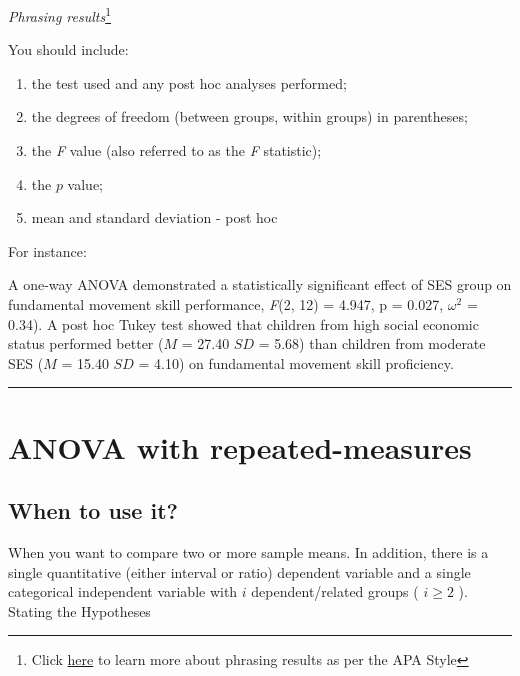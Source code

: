 \documentclass[
]{article}
\providecommand{\tightlist}{%
  \setlength{\itemsep}{0pt}\setlength{\parskip}{0pt}}
\begin{document}
\emph{Phrasing results}\footnote{Click \href{https://www.scribbr.com/apa-style/numbers-and-statistics/\#reporting-analysis-of-variance-anovas}{here} to learn more about phrasing results as per the APA Style}

You should include:

\begin{enumerate}
\def\labelenumi{\arabic{enumi}.}
\tightlist
\item
  the test used and any post hoc analyses performed;
\item
  the degrees of freedom (between groups, within groups) in parentheses;
\item
  the \emph{F} value (also referred to as the \emph{F} statistic);
\item
  the \(p\) value;
\item
  mean and standard deviation - post hoc
\end{enumerate}

For instance:

A one-way ANOVA demonstrated a statistically significant effect of SES group on fundamental movement skill performance, \emph{F}(2, 12) = 4.947, p = 0.027, \(\omega^2\) = 0.34). A post hoc Tukey test showed that children from high social economic status performed better (\(M\) = 27.40 \(SD\) = 5.68) than children from moderate SES (\(M\) = 15.40 \(SD\) = 4.10) on fundamental movement skill proficiency.

\begin{center}\rule{0.5\linewidth}{0.5pt}\end{center}

\hypertarget{anova-with-repeated-measures}{%
\section{ANOVA with repeated-measures}\label{anova-with-repeated-measures}}

\hypertarget{when-to-use-it-1}{%
\subsection{When to use it?}\label{when-to-use-it-1}}

When you want to compare two or more sample means. In addition, there is a single quantitative (either interval or ratio) dependent variable and a single categorical independent variable with \(i\) dependent/related groups ( \(i\geq 2\) ).\\
Stating the Hypotheses
\end{document}

